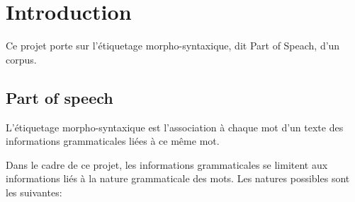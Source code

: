\section{Introduction}
Ce projet porte sur
l'étiquetage morpho-syntaxique, dit Part of Speach, d'un
corpus.

\subsection{Part of speech}
L'étiquetage morpho-syntaxique est l'association à chaque mot d'un
texte des informations grammaticales liées à ce même mot.


Dans le cadre de ce projet, les informations grammaticales se limitent
aux informations liés à la nature grammaticale des mots. Les natures
possibles sont les suivantes: 



